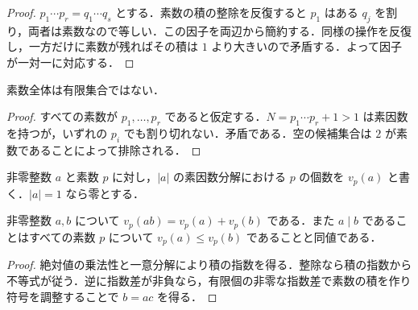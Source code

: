 \begin{proof}
$p_1\cdots p_r=q_1\cdots q_s$ とする．素数の積の整除を反復すると $p_1$ はある $q_j$ を割り，両者は素数なので等しい．この因子を両辺から簡約する．同様の操作を反復し，一方だけに素数が残ればその積は $1$ より大きいので矛盾する．よって因子が一対一に対応する．
\end{proof}
\begin{prop}[素数の無限性]
素数全体は有限集合ではない．
\end{prop}
\begin{proof}
すべての素数が $p_1,\ldots,p_r$ であると仮定する．$N=p_1\cdots p_r+1>1$ は素因数を持つが，いずれの $p_i$ でも割り切れない．矛盾である．空の候補集合は $2$ が素数であることによって排除される．
\end{proof}
\begin{defn}[素数に関する指数]
非零整数 $a$ と素数 $p$ に対し，$|a|$ の素因数分解における $p$ の個数を $v_p(a)$ と書く．$|a|=1$ なら零とする．
\end{defn}
\begin{prop}[指数と整除]
非零整数 $a,b$ について $v_p(ab)=v_p(a)+v_p(b)$ である．また $a\mid b$ であることはすべての素数 $p$ について $v_p(a)\leq v_p(b)$ であることと同値である．
\end{prop}
\begin{proof}
絶対値の乗法性と一意分解により積の指数を得る．整除なら積の指数から不等式が従う．逆に指数差が非負なら，有限個の非零な指数差で素数の積を作り符号を調整することで $b=ac$ を得る．
\end{proof}
